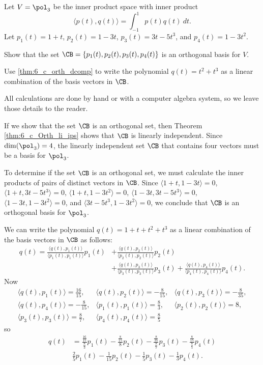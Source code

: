 \begin{example} Let $V = \pol_3$ be the inner product space with inner product 
\[\langle p(t), q(t) \rangle = \int_{-1}^1 p(t)q(t) \ dt.\]
Let $p_1(t) = 1+t$, $p_2(t) = 1-3t$, $p_3(t) = 3t-5t^3$, and $p_4(t) = 1-3t^2$. 
\ba
\item Show that the set $\CB = \{p_1(t), p_2(t), p_3(t), p_4(t)\}$ is an orthogonal basis for $V$.

\item  Use  \ref{thm:6_c_orth_dcomp} to write the polynomial $q(t) = t^2+t^3$ as a linear combination of the basis vectors in $\CB$. 

\ea

\ExampleSolution All calculations are done by hand or with a computer algebra system, so we leave those details to the reader. 
\ba
\item If we show that the set $\CB$ is an orthogonal set, then Theorem \ref{thm:6_c_Orth_li_ips} shows that $\CB$ is linearly independent. Since $\dim(\pol_3) = 4$, the linearly independent set $\CB$ that contains four vectors must be a basis for $\pol_3$. 

To determine if the set $\CB$ is an orthogonal set, we must calculate the inner products of pairs of distinct vectors in $\CB$. Since $\langle 1+t,1-3t \rangle = 0$, $\langle 1+t,3t-5t^3 \rangle = 0$, $\langle 1+t,1-3t^2 \rangle = 0$, $\langle 1-3t,3t-5t^3 \rangle = 0$, $\langle 1-3t,1-3t^2 \rangle = 0$, and $\langle 3t-5t^3,1-3t^2 \rangle = 0$, we conclude that $\CB$ is an orthogonal basis for $\pol_3$. 

\item  We can write the polynomial $q(t) = 1+t+t^2+t^3$ as a linear combination of the basis vectors in $\CB$ as follows:
\begin{align*}
q(t) = \frac{\langle q(t),p_1(t) \rangle }{\langle p_1(t),p_1(t) \rangle} p_1(t) &+ \frac{\langle q(t),p_2(t) \rangle }{\langle p_2(t),p_2(t) \rangle} p_2(t) \\
	&+ \frac{\langle q(t),p_3(t) \rangle }{\langle p_3(t),p_3(t) \rangle} p_3(t) + \frac{\langle q(t),p_4(t) \rangle }{\langle p_4(t),p_4(t) \rangle} p_4(t).
\end{align*}
Now 
\[\begin{array}{ccc}
\langle q(t), p_1(t) \rangle = \frac{16}{15}, &\langle q(t), p_2(t) \rangle = -\frac{8}{15}, &\langle q(t), p_3(t) \rangle = -\frac{8}{35}, \\
\langle q(t), p_4(t) \rangle = -\frac{8}{15}, &\langle p_1(t), p_1(t)\rangle  = \frac{8}{3}, &\langle p_2(t), p_2(t) \rangle = 8, \\
\langle p_3(t), p_3(t) \rangle = \frac{8}{7}, &\langle p_4(t), p_4(t) \rangle = \frac{8}{5} & 
\end{array}\]
so
\begin{align*}
q(t) &= \frac{ \frac{16}{15} }{ \frac{8}{3} } p_1(t) - \frac{ \frac{8}{15} }{ 8 } p_2(t) -  \frac{ \frac{8}{35} }{ \frac{8}{7} } p_3(t) -  \frac{ \frac{8}{15} }{ \frac{8}{5} } p_4(t) \\
	&\frac{2}{5} p_1(t) - \frac{1}{15}p_2(t) - \frac{1}{5} p_3(t) - \frac{1}{3} p_4(t).
\end{align*}


\end{example}
